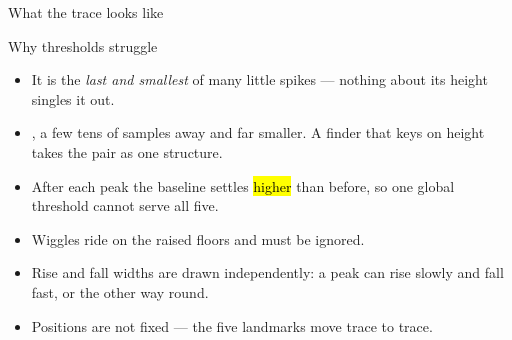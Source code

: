 \begin{frame}{What the trace looks like}
\end{frame}

\begin{frame}{Why thresholds struggle}
  \begin{itemize}
    \item {} It is the \emph{last and smallest}
          of many little spikes --- nothing about its height singles it out.
    \item {}, a few tens of samples away
          and far smaller. A finder that keys on height takes the pair as one
          structure.
    \item {} After each peak the baseline settles
          \hl{higher} than before, so one global threshold cannot serve all five.
    \item {} Wiggles ride on the
          raised floors and must be ignored.
    \item {} Rise and fall widths are drawn independently:
          a peak can rise slowly and fall fast, or the other way round.
    \item Positions are not fixed --- the five landmarks move trace to trace.
  \end{itemize}
\end{frame}

